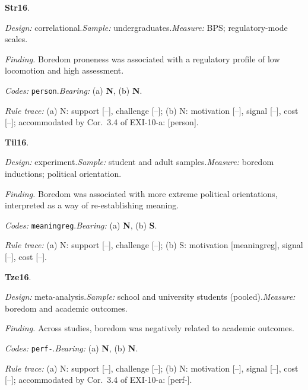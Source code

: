 \medskip
{}
\noindent\textbf{Str16}\enspace \citet{Struk2016}.\par
{\small\noindent\textit{Design:} correlational.\quad \textit{Sample:} undergraduates.\quad \textit{Measure:} BPS; regulatory-mode scales.\par
\noindent\textit{Finding.} Boredom proneness was associated with a regulatory profile of low locomotion and high assessment.\par
\noindent\textit{Codes:} \texttt{person}.\quad \textit{Bearing:} (a) \textbf{N}, (b) \textbf{N}.\par
\noindent\textit{Rule trace:} (a) N: support {[}--{]}, challenge {[}--{]}; (b) N: motivation {[}--{]}, signal {[}--{]}, cost {[}--{]}; accommodated by Cor.~3.4 of EXI-10-a: {[}person{]}.\par}
\medskip
{}
\noindent\textbf{Til16}\enspace \citet{vanTilburgIgou2016}.\par
{\small\noindent\textit{Design:} experiment.\quad \textit{Sample:} student and adult samples.\quad \textit{Measure:} boredom inductions; political orientation.\par
\noindent\textit{Finding.} Boredom was associated with more extreme political orientations, interpreted as a way of re-establishing meaning.\par
\noindent\textit{Codes:} \texttt{meaningreg}.\quad \textit{Bearing:} (a) \textbf{N}, (b) \textbf{S}.\par
\noindent\textit{Rule trace:} (a) N: support {[}--{]}, challenge {[}--{]}; (b) S: motivation {[}meaningreg{]}, signal {[}--{]}, cost {[}--{]}.\par}
\medskip
{}
\noindent\textbf{Tze16}\enspace \citet{Tze2016}.\par
{\small\noindent\textit{Design:} meta-analysis.\quad \textit{Sample:} school and university students (pooled).\quad \textit{Measure:} boredom and academic outcomes.\par
\noindent\textit{Finding.} Across studies, boredom was negatively related to academic outcomes.\par
\noindent\textit{Codes:} \texttt{perf-}.\quad \textit{Bearing:} (a) \textbf{N}, (b) \textbf{N}.\par
\noindent\textit{Rule trace:} (a) N: support {[}--{]}, challenge {[}--{]}; (b) N: motivation {[}--{]}, signal {[}--{]}, cost {[}--{]}; accommodated by Cor.~3.4 of EXI-10-a: {[}perf-{]}.\par}
\medskip
{}
